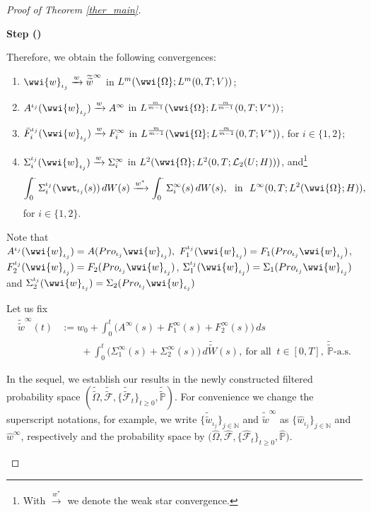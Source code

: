 \documentclass[english,a4paper,11pt]{amsart}
\theoremstyle{plain}
\theoremstyle{definition}
\theoremstyle{remark}
\numberwithin{equation}{section}
\newcounter{lil1}
\newenvironment{step}
{\begin{list} { \bf Step (\Roman{lil1})}
		{ \usecounter{lil1}
			\setlength{\leftmargin}{0.0cm}
			\setlength{\topsep}{0.2cm}
			\setlength{\itemsep}{0.0cm}
			\setlength{\parsep}{0.1cm}
			\setlength{\itemindent}{0.8cm}
			\setlength{\parskip}{0.0cm}}}
	{\end{list}}
\newcounter{lil33}
\newcounter{lil1q}
\newcommand{\wh}{\widehat}
\newcommand{\wi}[1]{{\widetilde{#1}}}
\def\wi{\widetilde}
\newcommand{\PP}{{\mathbb{P}}}
\newcommand{\N}{\mathbb{N}}
\newcommand{\Pro}{Pro}
\begin{document}
\begin{proof}[Proof of Theorem \ref{ther_main}]
\begin{step}
 
 
 
 
 
Therefore, we obtain the following convergences:
\begin{enumerate}
	\item $\wwi{w}_{{\iota_j}} \xrightarrow{w} \wi{\wi{w}}^\infty$ in $L^m(\wwi{\Omega};L^m(0,T;V))$; 
	\item $A^{{\iota_j}}(\wwi{w}_{{\iota_j}})\xrightarrow{w} A^\infty$ in $L^\frac m {m-1}(\wwi{\Omega};L^\frac m {m-1}(0,T;V^\ast))$;
\item 
	 $\bar F_i^{\iota_j} (\wwi{w}_{\iota_j} )  \xrightarrow{w} {F}_i^\infty$ in $L^\frac m {m-1}(\wwi{\Omega};L^\frac m {m-1}(0,T;V^\ast))$, for $i\in\{1,2\}$;
	\item $\Sigma_i^{{\iota_j}}(\wwi{w}_{{\iota_j}})\xrightarrow{w} {\Sigma_i^\infty}$ in $L^2(\wwi{\Omega}; L^2(0,T;\mathcal{L}_2(U;H)))$, and\footnote{With $\xrightarrow{w^\ast}$ we denote the weak star convergence.}
	\begin{align*}
		\int_0^{\cdot}\Sigma_i^{\iota_j}(	\wwt_{\iota_j}(s))\, dW(s) 			\xrightarrow{w^\ast}\int_0^{\cdot}\Sigma_i^\infty	(s)\, dW(s),\ \text{ in }\ L^\infty(0,T;L^2(\wwi{\Omega};H)) ,
	\end{align*}for $i\in\{1,2\}$. 
\end{enumerate}Note that $A^{\iota_j}(\wwi{w}_{{\iota_j}})=A(\Pro_{\iota_j} \wwi{w}_{{\iota_j}}), \ F_1^{\iota_j}(\wwi{w}_{{\iota_j}})=F_1(\Pro_{\iota_j}\wwi{w}_{{\iota_j}})$, $F_2^{\iota_j}(\wwi{w}_{{\iota_j}})=F_2(\Pro_{\iota_j}\wwi{w}_{{\iota_j}})$,  $\Sigma_{1}^{\iota_j}(\wwi{w}_{{\iota_j}})=\Sigma_1(\Pro_{\iota_j}\wwi{w}_{{\iota_j}})$ and $\Sigma_{2}^{\iota_j}(\wwi{w}_{{\iota_j}})=\Sigma_2(\Pro_{\iota_j}\wwi{w}_{{\iota_j}})$

Let us fix   
\begin{align*}
\wi{\wi{w}}^\infty(t)&:= w_0+\int_0^t \Big(A^\infty(s)+ F_1^\infty(s)+F_2^\infty(s)\Big)\,ds\\&\qquad +\int_0^t\big(\Sigma_1^\infty(s)+\Sigma_2^\infty(s)\big)\, d\wi{\wi{W}}(s),\ \text{for all } \ t\in[0,T], \ \wi{\wi{\PP}}\text{-a.s.}
\end{align*}


In the sequel, we establish our results in the newly constructed filtered probability space $(\wi{\wi{\Omega}},\wi{\wi{\mathcal{F}}}, \{\wi{\wi{\mathcal{F}}}_t\}_{t\geq 0},\wi{\wi{\PP}})$. For convenience we change the superscript notations, for example, we write $\{\wi{\wi{w}}_{\iota_j}\}_{j\in\N}$ and $\wi{\wi{w}}^\infty$ as $\{\wh{w}_{\iota_j}\}_{j\in\N}$ and $\wh{w}^\infty$, respectively and the probability space by $\big(\wh{\Omega},\wh{\mathcal{F}},\{\wh{\mathcal{F}}_t\}_{t\geq 0},\wh{\PP})$. 



\end{step}
\end{proof}
\end{document}
